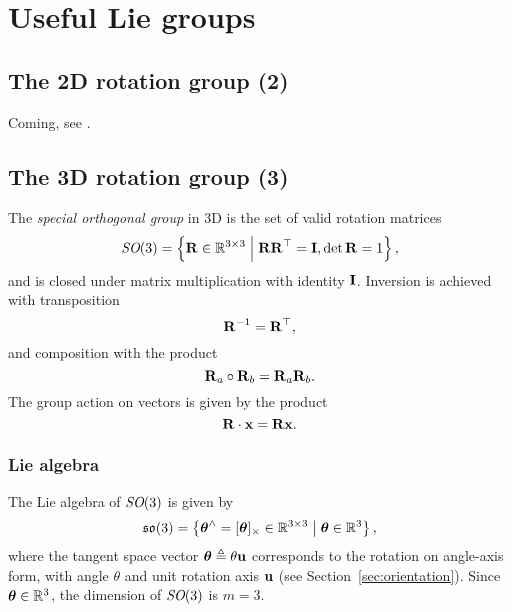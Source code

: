 \chapter{Useful Lie groups} \label{ch:useful-lie-groups}

\section{The 2D rotation group \SO(2)} \label{sec:SO2_group}
Coming, see \cite{SolaARobotics}.

\section{The 3D rotation group \SO(3)} \label{sec:SO3_group}
The \emph{special orthogonal group} in 3D is the set of valid rotation matrices
\begin{equation}
  \textit{SO}(3) = \left \{ {\boldsymbol{\mathbf{R}}} \in {\mathbb R}^{3 \times 3} \;\middle|\; {\boldsymbol{\mathbf{R}}}{\boldsymbol{\mathbf{R}}}^{\top} = {\boldsymbol{\mathbf{I}}}, \det {\boldsymbol{\mathbf{R}}} = 1 \right \},
\end{equation}
and is closed under matrix multiplication with identity ${\boldsymbol{\mathbf{I}}}$.
Inversion is achieved with transposition
\begin{equation}
  {\boldsymbol{\mathbf{R}}}^{-1} = {\boldsymbol{\mathbf{R}}}^{\top},
\end{equation}
and composition with the product
\begin{equation}
  {\boldsymbol{\mathbf{R}}}_a \circ {\boldsymbol{\mathbf{R}}}_b = {\boldsymbol{\mathbf{R}}}_a {\boldsymbol{\mathbf{R}}}_b.
\end{equation}
The group action on vectors is given by the product
\begin{equation} \label{eq:SO3-group-action}
  {\boldsymbol{\mathbf{R}}} \cdot {\boldsymbol{\mathbf{x}}} = {\boldsymbol{\mathbf{R}}} {\boldsymbol{\mathbf{x}}}.
\end{equation}

\subsection{Lie algebra}
The Lie algebra of $\textit{SO}(3)$ is given by
\begin{equation}
  {\mathfrak {so}}(3) = \left \{ {\boldsymbol{\mathbf{\theta}}}^\wedge = [{\boldsymbol{\mathbf{\theta}}}]_\times \in {\mathbb R}^{3 \times 3} \;\middle|\; {\boldsymbol{\mathbf{\theta}}} \in {\mathbb R}^3 \right \},
\end{equation}
where the tangent space vector ${\boldsymbol{\mathbf{\theta}}} \triangleq \theta {\boldsymbol{\mathbf{u}}}$ corresponds to the rotation on angle-axis form, with angle $\theta$ and unit rotation axis ${\boldsymbol{\mathbf{u}}}$ (see Section~\ref{sec:orientation}).
Since ${\boldsymbol{\mathbf{\theta}}} \in {\mathbb R}^3$, the dimension of $\textit{SO}(3)$ is $m = 3$.

